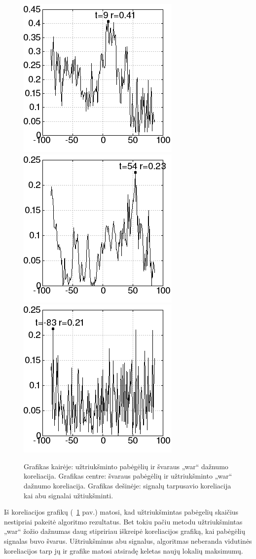 \begin{figure}
    \includegraphics[scale=0.65]{../scripts/refugees_war_rand/result_ref_rand.png}
    \includegraphics[scale=0.65]{../scripts/refugees_war_rand/result_war_rand.png}
    \includegraphics[scale=0.65]{../scripts/refugees_war_rand/result_both_rand.png}
    \caption{Grafikas kairėje: užtriukšminto pabėgėlių ir švaraus „war“ dažnumo koreliacija. Grafikas centre: švaraus pabėgėlių ir užtriukšminto „war“ dažnumo koreliacija. Grafikas dešinėje: signalų tarpusavio koreliacija kai abu signalai užtiukšminti.}
    \label{fig:noisy_cross}
\end{figure}

Iš koreliacijos grafikų (~\ref{fig:noisy_cross} pav.) matosi, kad užtriukšmintas pabėgelių skaičius nestipriai pakeitė algoritmo rezultatus.
Bet tokiu pačiu metodu užtriukšmintas „war“ žožio dažnumas daug stipririau iškreipė koreliacijos grafiką, kai pabėgėlių signalas buvo švarus.
Užtriukšminus abu signalus, algoritmas neberanda vidutinės koreliacijos tarp jų ir grafike matosi atsiradę keletas naujų lokalių maksimumų.
